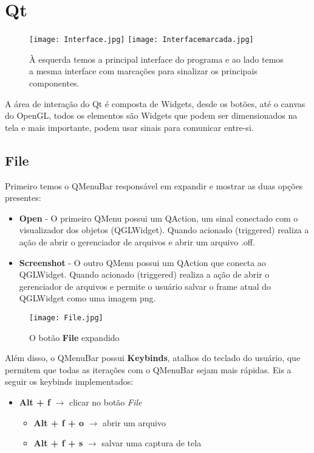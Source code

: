 \section{Qt}

\begin{figure}[ht]
    \centering
    \texttt{[image: Interface.jpg]}
    \texttt{[image: Interfacemarcada.jpg]}
    \caption{À esquerda temos a principal interface do programa e ao lado temos a mesma interface
    com marcações para sinalizar os principais componentes.}
\end{figure}

A área de interação do Qt é composta de Widgets, desde os botões, até o canvas 
do OpenGL, todos os elementos são Widgets que podem ser dimensionados na tela e 
mais importante, podem usar sinais para comunicar entre-si.

\subsection{File}

Primeiro temos o QMenuBar responsável em expandir e mostrar as duas
opções presentes:

\begin{itemize}
    \item \textbf{Open} - O primeiro QMenu possui um QAction, um sinal conectado
    com o visualizador dos objetos (QGLWidget). Quando acionado (triggered) realiza
    a ação de abrir o gerenciador de arquivos e abrir um arquivo .off.
    \item \textbf{Screenshot} - O outro QMenu possui um QAction que conecta 
    ao QGLWidget. Quando acionado (triggered) realiza a ação de abrir o gerenciador de arquivos
    e permite o usuário salvar o frame atual do QGLWidget como uma imagem png.
\end{itemize}

\begin{figure}[H]
    \centering
    \texttt{[image: File.jpg]}
    \caption{O botão \textbf{File} expandido}
\end{figure}

Além disso, o QMenuBar possui \textbf{Keybinds}, atalhos do teclado do usuário, 
que permitem que todas as iterações com o QMenuBar sejam mais rápidas. Eis a seguir 
os keybinds implementados:

\begin{itemize}
    \item \textbf{Alt + f} $\rightarrow$ clicar no botão \emph{File}
    \begin{itemize}
        \item \textbf{Alt + f + o} $\rightarrow$ abrir um arquivo 
        \item \textbf{Alt + f + s} $\rightarrow$ salvar uma captura de tela 
    \end{itemize}
\end{itemize}

